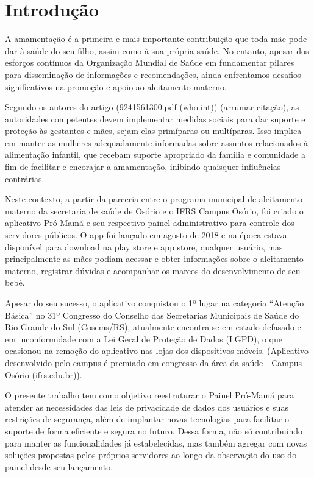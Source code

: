 \chapter{Introdução}

A amamentação é a primeira e mais importante contribuição que toda mãe pode dar à saúde do seu filho, assim como à sua própria saúde. No entanto, apesar dos esforços contínuos da Organização Mundial de Saúde
em fundamentar pilares para disseminação de informações e recomendações, ainda enfrentamos desafios significativos na promoção e apoio ao aleitamento materno.

Segundo os autores do artigo (9241561300.pdf (who.int)) (arrumar citação), as autoridades competentes devem implementar medidas sociais para dar suporte e proteção às gestantes e mães, sejam elas primíparas ou multíparas. Isso implica em manter as mulheres adequadamente informadas sobre assuntos relacionados à alimentação infantil, que recebam suporte apropriado da família e comunidade a fim de facilitar e encorajar a amamentação, inibindo quaisquer influências contrárias.

Neste contexto, a partir da parceria entre o programa municipal de aleitamento materno da secretaria de saúde de Osório e o IFRS Campus Osório, foi criado o aplicativo Pró-Mamá e seu respectivo painel administrativo para controle dos servidores públicos. O app foi lançado em agosto de 2018 e na época estava disponível para download na play store e app store, qualquer usuário, mas principalmente as mães podiam acessar e obter informações sobre o aleitamento materno, registrar dúvidas e acompanhar os marcos do desenvolvimento de seu bebê.

Apesar do seu sucesso, o aplicativo conquistou o 1º lugar na categoria “Atenção Básica” no 31º Congresso do Conselho das Secretarias Municipais de Saúde do Rio Grande do Sul (Cosems/RS), atualmente encontra-se em estado defasado e em inconformidade com a Lei Geral de Proteção de Dados (LGPD), o que ocasionou na remoção do aplicativo nas lojas dos dispositivos móveis. (Aplicativo desenvolvido pelo campus é premiado em congresso da área da saúde - Campus Osório (ifrs.edu.br)).

O presente trabalho tem como objetivo reestruturar o Painel Pró-Mamá para atender as necessidades das leis de privacidade de dados dos usuários e suas restrições de segurança, além de implantar novas tecnologias para facilitar o suporte de forma eficiente e segura no futuro. Dessa forma, não só contribuindo para manter as funcionalidades já estabelecidas, mas também agregar com novas soluções propostas pelos próprios servidores ao longo da observação do uso do painel desde seu lançamento.
